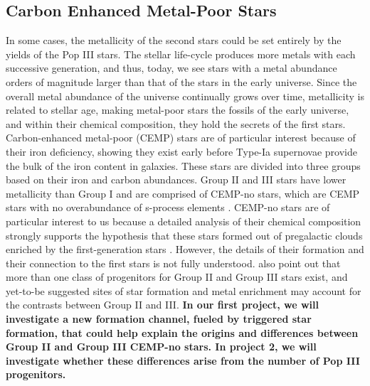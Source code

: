 \documentclass[letterpaper, 12pt]{article}
\begin{document}
\subsection*{Carbon Enhanced Metal-Poor Stars}

In some cases, the metallicity of the second stars could be set entirely by the yields of the Pop III stars. The stellar life-cycle produces more metals with each successive generation, and thus, today, we see stars with a metal abundance orders of magnitude larger than that of the stars in the early universe. Since the overall metal abundance of the universe continually grows over time, metallicity is related to stellar age, making metal-poor stars the fossils of the early universe, and within their chemical composition, they hold the secrets of the first stars. Carbon-enhanced metal-poor (CEMP) stars are of particular interest because of their iron deficiency, showing they exist early before Type-Ia supernovae provide the bulk of the iron content in galaxies. These stars are divided into three groups based on their iron and carbon abundances. Group II and III stars have lower metallicity than Group I and are comprised of CEMP-no stars, which are CEMP stars with no overabundance of s-process elements \citep{Maeder2015}. CEMP-no stars are of particular interest to us because a detailed analysis of their chemical composition strongly supports the hypothesis that these stars formed out of pregalactic clouds enriched by the first-generation stars \citep{Yoon2016}. However, the details of their formation and their connection to the first stars is not fully understood. \cite{Yoon2016} also point out that more than one class of progenitors for Group II and Group III stars exist, and yet-to-be suggested sites of star formation and metal enrichment may account for the contrasts between Group II and III. \textbf{In our first project, we will investigate a new formation channel, fueled by triggered star formation, that could help explain the origins and differences between Group II and Group III CEMP-no stars. In project 2, we will investigate whether these differences arise from the number of Pop III progenitors.}

\end{document}
